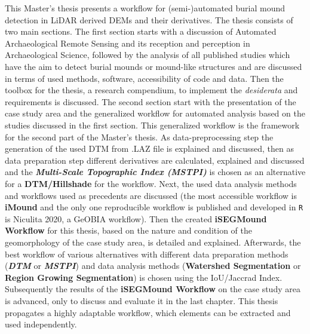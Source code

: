 \documentclass[
  12pt,
]{article}
\begin{document}
This Master's thesis presents a workflow for (semi-)automated burial mound detection in LiDAR derived DEMs and their derivatives.
\newline
The thesis consists of two main sections. The first section starts with a discussion of Automated Archaeological Remote Sensing and its reception and perception in Archaeological Science, followed by the analysis of all published studies which have the aim to detect burial mounds or mound-like structures and are discussed in terms of used methods, software, accessibility of code and data. Then the toolbox for the thesis, a research compendium, to implement the \emph{desiderata} and requirements is discussed.
The second section start with the presentation of the case study area and the generalized workflow for automated analysis based on the studies discussed in the first section. This generalized workflow is the framework for the second part of the Master's thesis. As data-preprocessing step the generation of the used DTM from .LAZ file is explained and discussed, then as data preparation step different derivatives are calculated, explained and discussed and the \textbf{\emph{Multi-Scale Topographic Index (MSTPI)}} is chosen as an alternative for a \textbf{DTM/Hillshade} for the workflow. Next, the used data analysis methods and workflows used as precedents are discussed (the most accessible workflow is \textbf{iMound} and the only one reproducible workflow is published and developed in \texttt{R} is Niculita 2020, a GeOBIA workflow). Then the created \textbf{iSEGMound Workflow} for this thesis, based on the nature and condition of the geomorphology of the case study area, is detailed and explained. Afterwards, the best workflow of various alternatives with different data preparation methods (\textbf{\emph{DTM}} or \textbf{\emph{MSTPI}}) and data analysis methods (\textbf{Watershed Segmentation} or \textbf{Region Growing Segmentation}) is chosen using the IoU/Jaccrad Index. Subsequently the results of the \textbf{iSEGMound Workflow} on the case study area is advanced, only to discuss and evaluate it in the last chapter.
\newline
This thesis propagates a highly adaptable workflow, which elements can be extracted and used independently.

\newpage

\centering
\raggedright
\newpage
\tableofcontents

\newpage

\vspace{5mm}
\justifying
\end{document}
